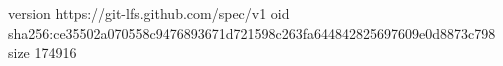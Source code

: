 version https://git-lfs.github.com/spec/v1
oid sha256:ce35502a070558c9476893671d721598c263fa644842825697609e0d8873c798
size 174916
